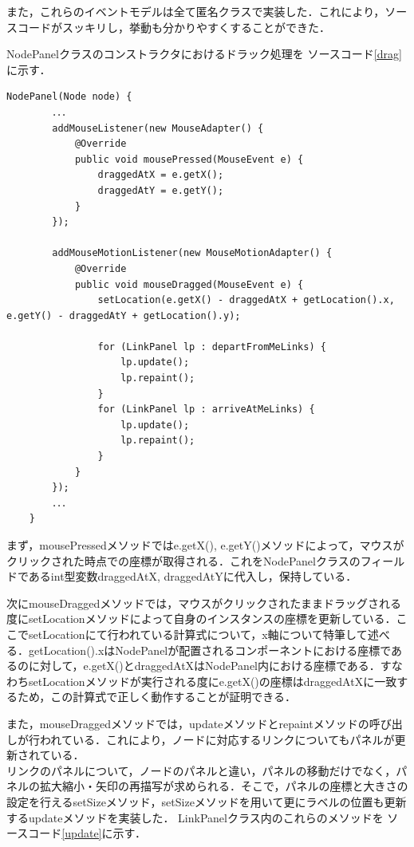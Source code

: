 \documentclass[12pt]{jarticle}
\begin{document}
また，これらのイベントモデルは全て匿名クラスで実装した．これにより，ソースコードがスッキリし，挙動も分かりやすくすることができた．

NodePanelクラスのコンストラクタにおけるドラック処理を
ソースコード\ref{drag}に示す．

\begin{lstlisting}[caption=NodePanelクラスのコンストラクタ, label=drag]
    NodePanel(Node node) {
        ．．．
        addMouseListener(new MouseAdapter() {
            @Override
            public void mousePressed(MouseEvent e) {
                draggedAtX = e.getX();
                draggedAtY = e.getY();
            }
        });

        addMouseMotionListener(new MouseMotionAdapter() {
            @Override
            public void mouseDragged(MouseEvent e) {
                setLocation(e.getX() - draggedAtX + getLocation().x, e.getY() - draggedAtY + getLocation().y);

                for (LinkPanel lp : departFromMeLinks) {
                    lp.update();
                    lp.repaint();
                }
                for (LinkPanel lp : arriveAtMeLinks) {
                    lp.update();
                    lp.repaint();
                }
            }
        });
        ．．．
    }
\end{lstlisting}

まず，mousePressedメソッドではe.getX(), e.getY()メソッドによって，マウスがクリックされた時点での座標が取得される．これをNodePanelクラスのフィールドであるint型変数draggedAtX,  draggedAtYに代入し，保持している．

次にmouseDraggedメソッドでは，マウスがクリックされたままドラッグされる度にsetLocationメソッドによって自身のインスタンスの座標を更新している．ここでsetLocationにて行われている計算式について，x軸について特筆して述べる．getLocation().xはNodePanelが配置されるコンポーネントにおける座標であるのに対して，e.getX()とdraggedAtXはNodePanel内における座標である．すなわちsetLocationメソッドが実行される度にe.getX()の座標はdraggedAtXに一致するため，この計算式で正しく動作することが証明できる．

また，mouseDraggedメソッドでは，updateメソッドとrepaintメソッドの呼び出しが行われている．これにより，ノードに対応するリンクについてもパネルが更新されている． \\

リンクのパネルについて，ノードのパネルと違い，パネルの移動だけでなく，パネルの拡大縮小・矢印の再描写が求められる．そこで，パネルの座標と大きさの設定を行えるsetSizeメソッド，setSizeメソッドを用いて更にラベルの位置も更新するupdateメソッドを実装した．
LinkPanelクラス内のこれらのメソッドを
ソースコード\ref{update}に示す．
\end{document}
